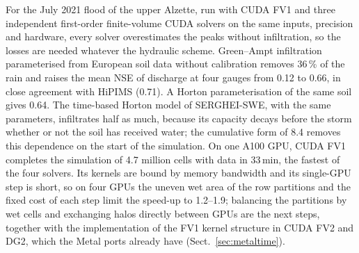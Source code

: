 \documentclass[gmd, manuscript]{copernicus}
\begin{document}
For the July 2021 flood of the upper Alzette, run with CUDA FV1 and three
independent first-order finite-volume CUDA solvers on the same inputs,
precision and hardware, every solver overestimates the peaks without
infiltration, so the losses are needed whatever the
hydraulic scheme. Green--Ampt infiltration parameterised from European soil
data without calibration removes 36\,\% of the rain and raises the mean NSE
of discharge at four gauges from 0.12 to 0.66, in close agreement with HiPIMS
(0.71). A Horton parameterisation of the same soil gives 0.64. The time-based
Horton model of SERGHEI-SWE, with the same parameters, infiltrates half as
much, because its capacity decays before the storm whether or not the soil
has received water; the cumulative form of 8.4 removes this dependence on the
start of the simulation. On one A100 GPU, CUDA FV1 completes the
simulation of 4.7 million cells with data in 33\,min, the fastest of the
four solvers.
Its kernels are bound by memory bandwidth and its single-GPU step is short,
so on four GPUs the uneven wet area of the row partitions and the fixed cost
of each step limit the speed-up to 1.2--1.9; balancing the partitions by wet
cells and exchanging halos directly between GPUs are the next steps, together
with the implementation of the FV1 kernel structure in CUDA FV2 and DG2,
which the Metal ports already have (Sect.~\ref{sec:metaltime}).


\end{document}
